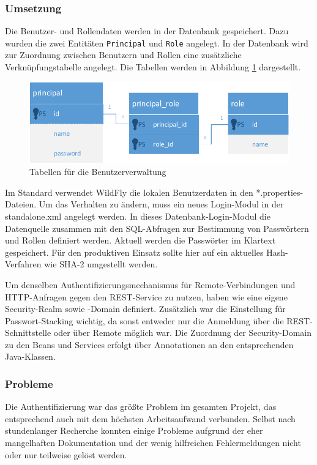 \subsubsection{Umsetzung}
Die Benutzer- und Rollendaten werden in der Datenbank gespeichert. Dazu wurden die zwei Entitäten \texttt{Principal} und \texttt{Role} angelegt. In der Datenbank wird zur Zuordnung zwischen Benutzern und Rollen eine zusätzliche Verknüpfungstabelle angelegt. Die Tabellen werden in Abbildung \ref{fig:BenutzerRollen} dargestellt.

\begin{figure}[tbh]
\centering
\includegraphics[width=1.0\linewidth]{Bilder/BenutzerRollen}
\caption{Tabellen für die Benutzerverwaltung}
\label{fig:BenutzerRollen}
\end{figure}

Im Standard verwendet WildFly die lokalen Benutzerdaten in den *.properties-Dateien. Um das Verhalten zu ändern, muss ein neues Login-Modul in der standalone.xml angelegt werden. In dieses Datenbank-Login-Modul die Datenquelle zusammen mit den SQL-Abfragen zur Bestimmung von Passwörtern und Rollen definiert werden. Aktuell werden die Passwörter im Klartext gespeichert. Für den produktiven Einsatz sollte hier auf ein aktuelles Hash-Verfahren wie SHA-2 umgestellt werden.

Um denselben Authentifizierungsmechanismus für Remote-Verbindungen und HTTP-Anfragen gegen den REST-Service zu nutzen, haben wie eine eigene Security-Realm sowie -Domain definiert. Zusätzlich war die Einstellung für Passwort-Stacking wichtig, da sonst entweder nur die Anmeldung über die REST-Schnittstelle oder über Remote möglich war. Die Zuordnung der Security-Domain zu den Beans und Services erfolgt über Annotationen an den entsprechenden Java-Klassen. 

\subsubsection{Probleme}
Die Authentifizierung war das größte Problem im gesamten Projekt, das entsprechend auch mit dem höchsten Arbeitsaufwand verbunden. Selbst nach stundenlanger Recherche konnten einige Probleme aufgrund der eher mangelhaften Dokumentation und der wenig hilfreichen Fehlermeldungen nicht oder nur teilweise gelöst werden.

